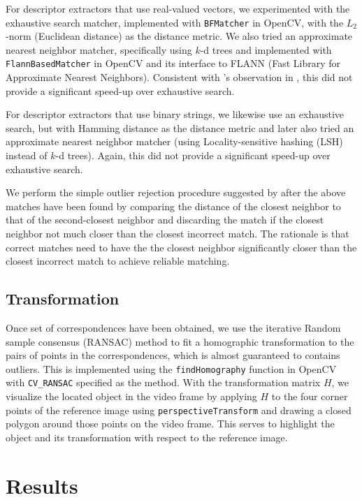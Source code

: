 \documentclass[11pt]{article} %
\theoremstyle{plain}
\theoremstyle{definition}
\theoremstyle{remark}
\numberwithin{equation}{section} %
\numberwithin{figure}{section} %
\numberwithin{table}{section} %
\begin{document}
For descriptor extractors that use real-valued vectors, we experimented with the exhaustive 
search matcher, implemented with \texttt{BFMatcher} in OpenCV, with the $L_2$-norm (Euclidean 
distance) as the distance metric. We also tried an approximate nearest neighbor matcher, 
specifically using $k$-d trees and implemented with \texttt{FlannBasedMatcher} in OpenCV 
and its interface to FLANN (Fast Library for Approximate Nearest Neighbors). Consistent with 
\citeauthor{Lowe2004}'s observation in \citep{Lowe2004}, this did not provide a significant 
speed-up over exhaustive search. 

For descriptor extractors that use binary strings, we likewise use an exhaustive search, but
with Hamming distance as the distance metric and later also tried an approximate nearest neighbor 
matcher (using Locality-sensitive hashing (LSH) instead of $k$-d trees). Again, this did not 
provide a significant speed-up over exhaustive search. 

We perform the simple outlier rejection procedure suggested by \citeauthor{Lowe2004} after 
the above matches have been found by comparing the distance of the closest neighbor 
to that of the second-closest neighbor and discarding the match if the closest neighbor
not much closer than the closest incorrect match. The rationale is that correct matches need 
to have the the closest neighbor significantly closer than the closest incorrect match to 
achieve reliable matching.

\subsection{Transformation}

Once set of correspondences have been obtained, we use the iterative Random sample consensus 
(RANSAC) method to fit a homographic transformation to the pairs of points in the correspondences,
which is almost guaranteed to contains outliers. This is implemented using the \texttt{findHomography} 
function in OpenCV with \texttt{CV\_RANSAC} specified as the method. With the transformation 
matrix $H$, we visualize the located object in the video frame by applying $H$ to the four corner 
points of the reference image using \texttt{perspectiveTransform} and drawing a closed polygon 
around those points on the video frame. This serves to highlight the object and its transformation 
with respect to the reference image.

\section{Results} \label{sec:results}




\end{document}
